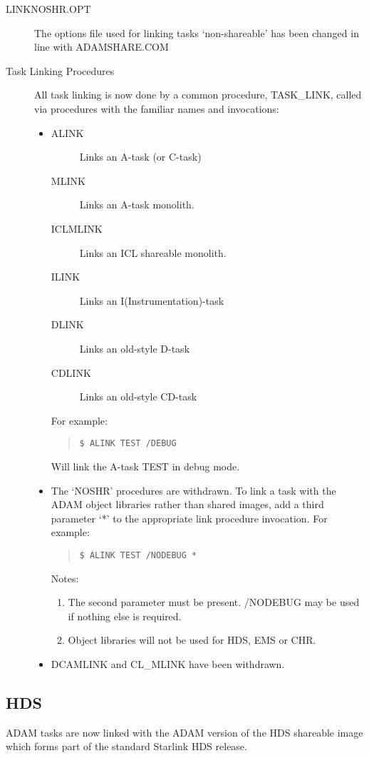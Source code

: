 \begin{description}
\item[LINKNOSHR.OPT]
The options file used for linking tasks `non-shareable' has been changed in
line with ADAMSHARE.COM

\item[Task Linking Procedures]
\label{links}
All task linking is now done by a common procedure, TASK\_LINK, called
via procedures with the familiar names and invocations:
\begin{itemize}
\item \begin{description}
\item[ALINK] Links an A-task (or C-task)
\item[MLINK] Links an A-task monolith.
\item[ICLMLINK] Links an ICL shareable monolith.
\item[ILINK] Links an I(Instrumentation)-task
\item[DLINK] Links an old-style D-task
\item[CDLINK] Links an old-style CD-task
\end{description}
For example:
\begin{quote} \begin{verbatim}
$ ALINK TEST /DEBUG
\end{verbatim} \end{quote}
Will link the A-task TEST in debug mode.
\item The `NOSHR' procedures are withdrawn.
To link a task with the ADAM object libraries rather than shared images, 
add a third parameter `*' to the appropriate link procedure invocation.
For example:
\begin{quote} \begin{verbatim}
$ ALINK TEST /NODEBUG *
\end{verbatim} \end{quote}
Notes:
\begin{enumerate}
\item The second parameter must be present. /NODEBUG may be used if nothing
else is required.
\item Object libraries will not be used for HDS, EMS or CHR.
\end{enumerate}
\item DCAMLINK and CL\_MLINK have been withdrawn.
\end{itemize}
\end{description}

\subsection{HDS}
\label{hds}
ADAM tasks are now linked with the ADAM version of the HDS shareable image
which forms part of the standard Starlink HDS release.


